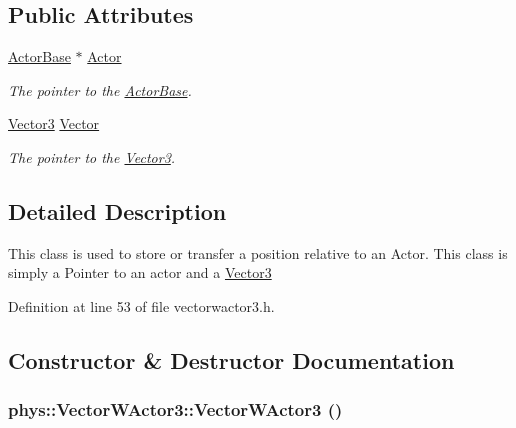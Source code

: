 \subsection*{Public Attributes}
\begin{DoxyCompactItemize}
\item 
\hypertarget{classphys_1_1VectorWActor3_aa43c18c4248dfe34bc78276ab0d10a30}{
\hyperlink{classphys_1_1ActorBase}{ActorBase} $\ast$ \hyperlink{classphys_1_1VectorWActor3_aa43c18c4248dfe34bc78276ab0d10a30}{Actor}}
\label{de/ddc/classphys_1_1VectorWActor3_aa43c18c4248dfe34bc78276ab0d10a30}

\begin{DoxyCompactList}\small\item\em The pointer to the \hyperlink{classphys_1_1ActorBase}{ActorBase}. \item\end{DoxyCompactList}\item 
\hypertarget{classphys_1_1VectorWActor3_adb6bb1ad45acdc95d453ce8d087fa447}{
\hyperlink{classphys_1_1Vector3}{Vector3} \hyperlink{classphys_1_1VectorWActor3_adb6bb1ad45acdc95d453ce8d087fa447}{Vector}}
\label{de/ddc/classphys_1_1VectorWActor3_adb6bb1ad45acdc95d453ce8d087fa447}

\begin{DoxyCompactList}\small\item\em The pointer to the \hyperlink{classphys_1_1Vector3}{Vector3}. \item\end{DoxyCompactList}\end{DoxyCompactItemize}


\subsection{Detailed Description}
This class is used to store or transfer a position relative to an Actor. This class is simply a Pointer to an actor and a \hyperlink{classphys_1_1Vector3}{Vector3} 

Definition at line 53 of file vectorwactor3.h.



\subsection{Constructor \& Destructor Documentation}
\hypertarget{classphys_1_1VectorWActor3_acd6cc8c99617e66393aced2f1f36a438}{
\subsubsection[{VectorWActor3}]{\setlength{\rightskip}{0pt plus 5cm}phys::VectorWActor3::VectorWActor3 ()}}
\label{de/ddc/classphys_1_1VectorWActor3_acd6cc8c99617e66393aced2f1f36a438}


